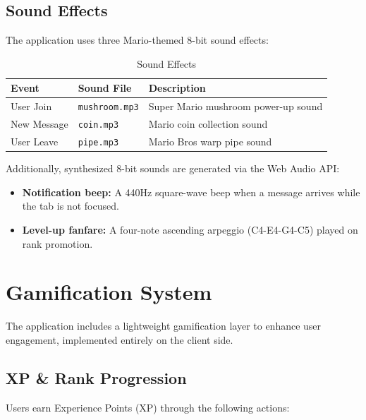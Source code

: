 \documentclass[12pt, a4paper]{article}
\begin{document}
\subsection{Sound Effects}

The application uses three Mario-themed 8-bit sound effects:

\begin{table}[H]
    \centering
    \caption{Sound Effects}
    \begin{tabularx}{\textwidth}{l l X}
        \toprule
        \textbf{Event} & \textbf{Sound File} & \textbf{Description} \\
        \midrule
        User Join   & \texttt{mushroom.mp3} & Super Mario mushroom power-up sound \\
        New Message & \texttt{coin.mp3}     & Mario coin collection sound \\
        User Leave  & \texttt{pipe.mp3}     & Mario Bros warp pipe sound \\
        \bottomrule
    \end{tabularx}
\end{table}

Additionally, synthesized 8-bit sounds are generated via the Web Audio API:
\begin{itemize}[leftmargin=*]
    \item \textbf{Notification beep:} A 440Hz square-wave beep when a message arrives while the tab is not focused.
    \item \textbf{Level-up fanfare:} A four-note ascending arpeggio (C4-E4-G4-C5) played on rank promotion.
\end{itemize}


\section{Gamification System}

The application includes a lightweight gamification layer to enhance user engagement, implemented entirely on the client side.

\subsection{XP \& Rank Progression}

Users earn Experience Points (XP) through the following actions:
\end{document}
